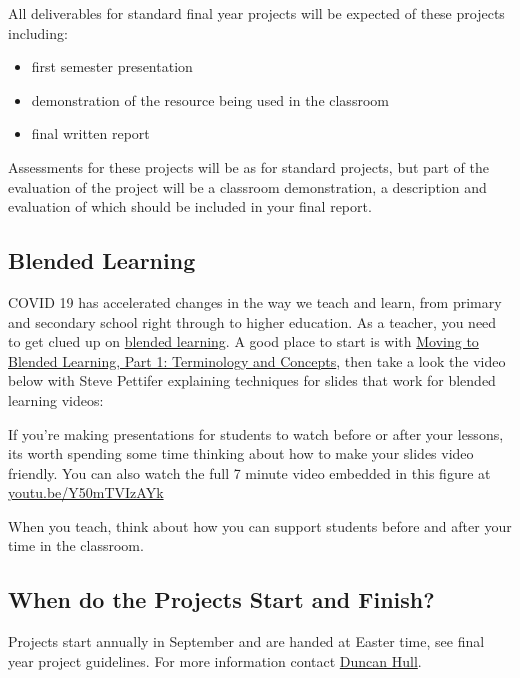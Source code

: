 \documentclass[
  12pt,
]{book}
\providecommand{\tightlist}{%
  \setlength{\itemsep}{0pt}\setlength{\parskip}{0pt}}
\begin{document}
All deliverables for standard final year projects will be expected of these projects including:

\begin{itemize}
\tightlist
\item
  first semester presentation
\item
  demonstration of the resource being used in the classroom
\item
  final written report
\end{itemize}

Assessments for these projects will be as for standard projects, \citep{COMP30030, COMP30040} but part of the evaluation of the project will be a classroom demonstration, a description and evaluation of which should be included in your final report.

\subsection{Blended Learning}\label{blended}

COVID 19 has accelerated changes in the way we teach and learn, from primary and secondary school right through to higher education. As a teacher, you need to get clued up on \href{https://en.wikipedia.org/wiki/Blended_learning}{blended learning}. A good place to start is with \href{http://www.elearning.fse.manchester.ac.uk/fseta/moving-to-blended-learning-part-1-terminology-and-concepts/}{Moving to Blended Learning, Part 1: Terminology and Concepts}, then take a look the video below with Steve Pettifer explaining techniques for slides that work for blended learning videos:

\label{fig:srp-fig}If you're making presentations for students to watch before or after your lessons, its worth spending some time thinking about how to make your slides video friendly. You can also watch the full 7 minute video embedded in this figure at \href{https://youtu.be/Y50mTVIzAYk}{youtu.be/Y50mTVIzAYk} \citep{youtube-srp}



When you teach, think about how you can support students before and after your time in the classroom.

\subsection{When do the Projects Start and Finish?}\label{finishing}

Projects start annually in September and are handed at Easter time, see final year project guidelines. For more information contact \hyperref[Contact]{Duncan Hull}.
\end{document}
